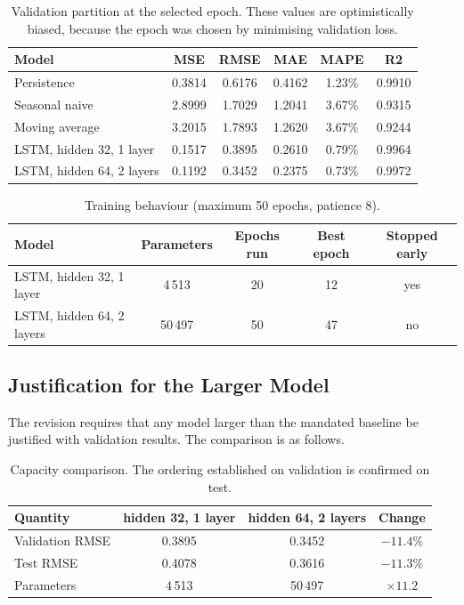 \documentclass[11pt,a4paper]{article}
\begin{document}
\begin{table}[H]
\centering
\begin{tabular}{lccccc}
\toprule
\textbf{Model} & \textbf{MSE} & \textbf{RMSE} & \textbf{MAE} & \textbf{MAPE} & \textbf{R2} \\
\midrule
Persistence                   & 0.3814 & 0.6176 & 0.4162 & 1.23\% & 0.9910 \\
Seasonal naive                & 2.8999 & 1.7029 & 1.2041 & 3.67\% & 0.9315 \\
Moving average                & 3.2015 & 1.7893 & 1.2620 & 3.67\% & 0.9244 \\
\midrule
LSTM, hidden 32, 1 layer      & 0.1517 & 0.3895 & 0.2610 & 0.79\% & 0.9964 \\
LSTM, hidden 64, 2 layers     & 0.1192 & 0.3452 & 0.2375 & 0.73\% & 0.9972 \\
\bottomrule
\end{tabular}
\caption{Validation partition at the selected epoch. These values are optimistically biased,
because the epoch was chosen by minimising validation loss.}
\end{table}

\begin{table}[H]
\centering
\begin{tabular}{lcccc}
\toprule
\textbf{Model} & \textbf{Parameters} & \textbf{Epochs run} & \textbf{Best epoch} & \textbf{Stopped early} \\
\midrule
LSTM, hidden 32, 1 layer  & 4\,513  & 20 & 12 & yes \\
LSTM, hidden 64, 2 layers & 50\,497 & 50 & 47 & no \\
\bottomrule
\end{tabular}
\caption{Training behaviour (maximum 50 epochs, patience 8).}
\end{table}

\subsection{Justification for the Larger Model}

The revision requires that any model larger than the mandated baseline be justified with
validation results. The comparison is as follows.

\begin{table}[H]
\centering
\begin{tabular}{lccc}
\toprule
\textbf{Quantity} & \textbf{hidden 32, 1 layer} & \textbf{hidden 64, 2 layers} & \textbf{Change} \\
\midrule
Validation RMSE & 0.3895 & 0.3452 & $-11.4\%$ \\
Test RMSE       & 0.4078 & 0.3616 & $-11.3\%$ \\
Parameters      & 4\,513 & 50\,497 & $\times 11.2$ \\
\bottomrule
\end{tabular}
\caption{Capacity comparison. The ordering established on validation is confirmed on test.}
\end{table}
\end{document}
